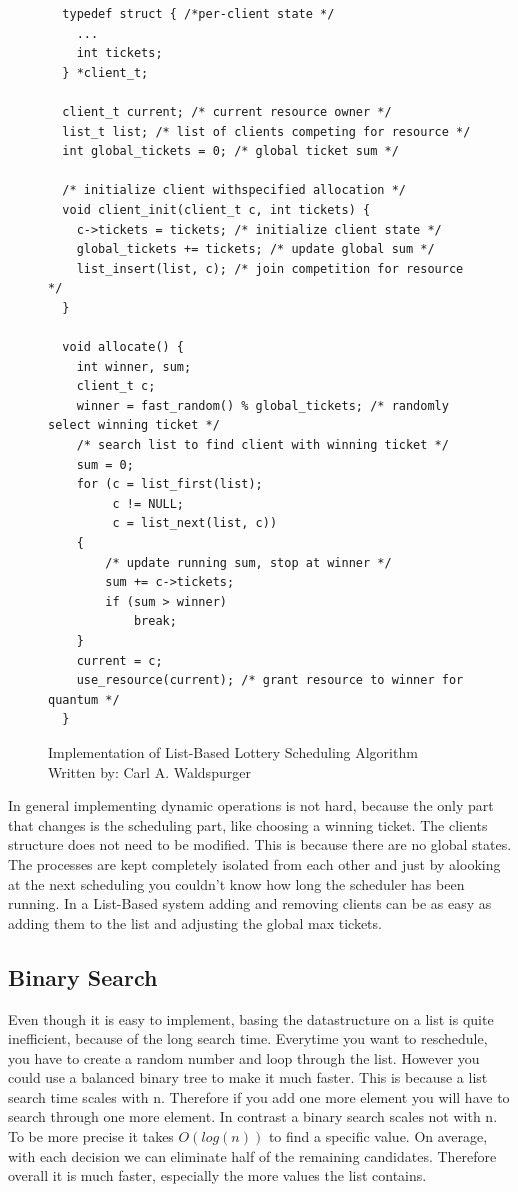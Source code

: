 \begin{figure}[H]
    \begin{verbatim}
  typedef struct { /*per-client state */
    ...
    int tickets;
  } *client_t;

  client_t current; /* current resource owner */
  list_t list; /* list of clients competing for resource */
  int global_tickets = 0; /* global ticket sum */

  /* initialize client withspecified allocation */
  void client_init(client_t c, int tickets) {
    c->tickets = tickets; /* initialize client state */ 
    global_tickets += tickets; /* update global sum */
    list_insert(list, c); /* join competition for resource */
  }

  void allocate() {
    int winner, sum;
    client_t c;
    winner = fast_random() % global_tickets; /* randomly select winning ticket */
    /* search list to find client with winning ticket */
    sum = 0;
    for (c = list_first(list);
         c != NULL;
         c = list_next(list, c))
    {
        /* update running sum, stop at winner */
        sum += c->tickets;
        if (sum > winner)
            break;
    }
    current = c;
    use_resource(current); /* grant resource to winner for quantum */
  }
    \end{verbatim}
    \caption{Implementation of List-Based Lottery Scheduling Algorithm\\Written by: Carl A. Waldspurger \cite{waldspurger95}}
    \label{code:lottery-sched}
\end{figure}

In general implementing dynamic operations is not hard, because the only part that changes is the scheduling part, like choosing a winning ticket.
The clients structure does not need to be modified.
This is because there are no global states. The processes are kept completely isolated from each other and just by alooking at the next scheduling you couldn't know how long the scheduler has been running.
In a List-Based system adding and removing clients can be as easy as adding them to the list and adjusting the global max tickets.


\subsection{Binary Search}

Even though it is easy to implement, basing the datastructure on a list is quite inefficient, because of the long search time.
Everytime you want to reschedule, you have to create a random number and loop through the list.
However you could use a balanced binary tree to make it much faster.
This is because a list search time scales with n. 
Therefore if you add one more element you will have to search through one more element.
In contrast a binary search scales not with n.
To be more precise it takes $O(log(n))$ to find a specific value.
On average, with each decision we can eliminate half of the remaining candidates.
Therefore overall it is much faster, especially the more values the list contains.

